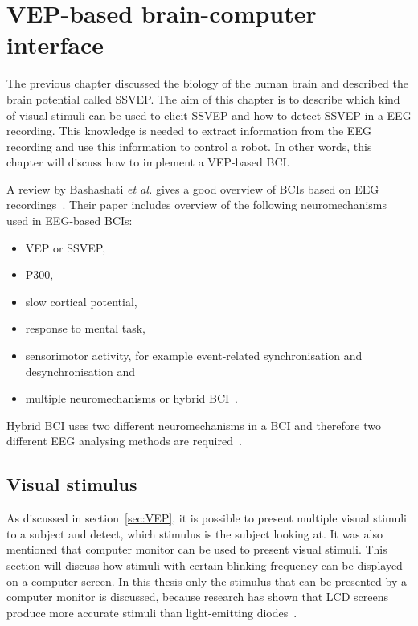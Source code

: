 
\chapter{VEP-based brain-computer interface}

The previous chapter discussed the biology of the human brain and described the brain potential called \gls{SSVEP}. The aim of this chapter is to describe which kind of visual stimuli can be used to elicit \gls{SSVEP} and how to detect \gls{SSVEP} in a \gls{EEG} recording. This knowledge is needed to extract information from the \gls{EEG} recording and use this information to control a robot. In other words, this chapter will discuss how to implement a \gls{VEP}-based \gls{BCI}.

A review by Bashashati \emph{et al.} gives a good overview of \glspl{BCI} based on \gls{EEG} recordings~\cite{bci_comparison}. Their paper includes overview of the following neuromechanisms used in \gls{EEG}-based \glspl{BCI}:
\begin{itemize}
	\item \gls{VEP} or \gls{SSVEP},
	\item P300,
	\item slow cortical potential,
	\item response to mental task,
	\item sensorimotor activity, for example event-related synchronisation and desynchronisation and
	\item multiple neuromechanisms or hybrid \gls{BCI}~\cite{hybrid_bci, hybrid_bci2}.
\end{itemize}
Hybrid \gls{BCI} uses two different neuromechanisms in a \gls{BCI} and therefore two different \gls{EEG} analysing methods are required~\cite{hybrid_bci, hybrid_bci2}.

\section{Visual stimulus}

As discussed in section~\ref{sec:VEP}, it is possible to present multiple visual stimuli to a subject and detect, which stimulus is the subject looking at. It was also mentioned that computer monitor can be used to present visual stimuli. This section will discuss how stimuli with certain blinking frequency can be displayed on a computer screen. In this thesis only the stimulus that can be presented by a computer monitor is discussed, because research has shown that LCD screens produce more accurate stimuli than light-emitting diodes~\cite{lcd_lcd_led}. 

